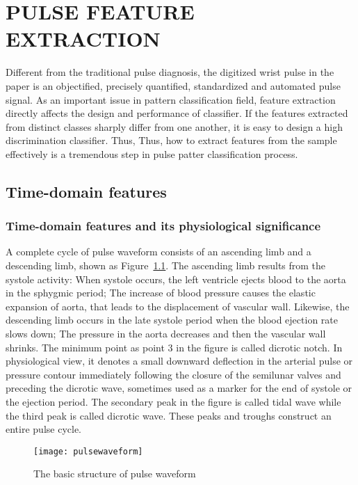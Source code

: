\chapter[Pulse feature extraction]{\uppercase{Pulse feature extraction}}
\label{chap:four}

Different from the traditional pulse diagnosis, the digitized wrist
pulse in the paper is an objectified, precisely quantified,
standardized and automated pulse signal. As an important issue in
pattern classification field, feature extraction directly affects the
design and performance of classifier. If the features extracted from
distinct classes sharply differ from one another, it is easy to design a
high discrimination classifier. Thus, Thus, how to extract features from the
sample effectively is a tremendous step in pulse patter
classification process. 

\section{Time-domain features}
\subsection{Time-domain features and its physiological significance}
A complete cycle of pulse waveform consists of an ascending limb and a
descending limb, shown as Figure~\ref{fig:waveform}. The ascending limb results from the systole activity:  
When systole occurs, the left ventricle ejects blood to the aorta in the sphygmic
period; The increase of blood pressure causes the elastic expansion
of aorta, that leads to the displacement of vascular wall. Likewise,
the descending limb occurs in the late systole period when the blood
ejection rate slows down; The pressure in the aorta decreases and then the
vascular wall shrinks. 
The minimum point as point 3
in the figure is called dicrotic notch. In physiological view, it
denotes a small downward deflection in the arterial pulse or pressure
contour immediately following the closure of the semilunar valves and
preceding the dicrotic wave, sometimes used as a marker for the end of
systole or the ejection period. The secondary peak in the figure is
called tidal wave while the third peak is called dicrotic wave. 
These peaks and troughs construct an entire pulse cycle. 
\begin{figure}[htbp]
    \begin{center}
        \texttt{[image: pulsewaveform]}
    \end{center}
    \caption{The basic structure of pulse waveform}
    \label{fig:waveform}
\end{figure}

